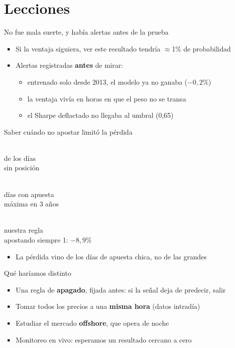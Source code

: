 \documentclass[aspectratio=169,11pt]{beamer}
\newcommand{\fuente}[1]{}
\newcommand{\cifra}[2]{\begin{minipage}[t]{0.3\textwidth}\centering{\Huge\bfseries\color{darkred}#1}\\[1mm]{\small #2}\end{minipage}}
\begin{document}
\section{Lecciones}
\begin{frame}{No fue mala suerte, y había alertas antes de la prueba}
\begin{itemize}\setlength\itemsep{4mm}
\item Si la ventaja siguiera, ver este resultado tendría $\approx$1\% de probabilidad
\item Alertas registradas \textbf{antes} de mirar:
  \begin{itemize}\setlength\itemsep{1mm}
  \item entrenado solo desde 2013, el modelo ya no ganaba ($-0{,}2$\%)
  \item la ventaja vivía en horas en que el peso no se transa
  \item el Sharpe deflactado no llegaba al umbral (0,65)
  \end{itemize}
\end{itemize}
\fuente{informe, Sección 9 (p.~31), Sección 6.2 (p.~23) y Sección 6.1.4 (p.~20)}
\end{frame}

\begin{frame}{Saber cuándo no apostar limitó la pérdida}
\centering\vspace{4mm}
\cifra{54\%}{de los días\\sin posición}\hfill
\cifra{13}{días con apuesta\\máxima en 3 años}\hfill
\cifra{$-5{,}1$\%}{nuestra regla\\{\color{gris}apostando siempre 1: $-8{,}9$\%}}
\vspace{10mm}
\begin{itemize}
\item La pérdida vino de los días de apuesta chica, no de las grandes
\end{itemize}
\fuente{informe, Tabla 9 (p.~21) y Tabla 11 (p.~23)}
\end{frame}

\begin{frame}{Qué haríamos distinto}
\begin{itemize}\setlength\itemsep{4mm}
\item Una regla de \textbf{apagado}, fijada antes: si la señal deja de predecir, salir
\item Tomar todos los precios a una \textbf{misma hora} (datos intradía)
\item Estudiar el mercado \textbf{offshore}, que opera de noche
\item Monitoreo en vivo: esperamos un resultado cercano a cero
\end{itemize}
\fuente{informe, Sección 9, Extensiones (p.~31) y Sección 8 (p.~30)}
\end{frame}
\end{document}
